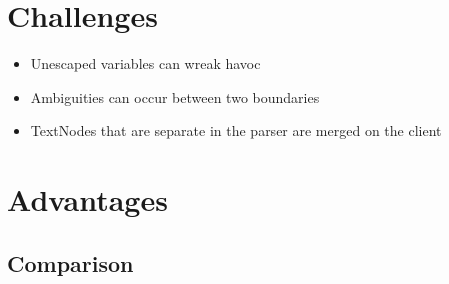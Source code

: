 \documentclass[thesis.tex]{subfiles}
\begin{document}
\section{Challenges}
\begin{itemize}
\item Unescaped variables can wreak havoc
\item Ambiguities can occur between two boundaries
\item TextNodes that are separate in the parser are merged on the client
\end{itemize}
\section{Advantages}
\subsection{Comparison}
\end{document}
